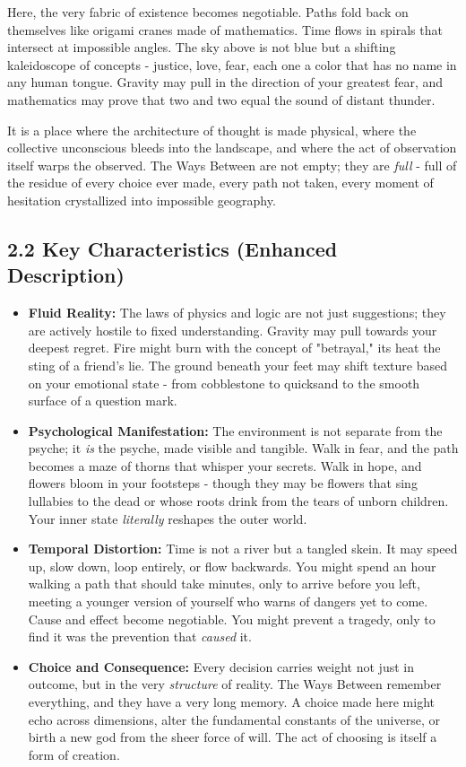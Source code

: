 \documentclass[11pt]{article}
\begin{document}
Here, the very fabric of existence becomes negotiable. Paths fold back on themselves like origami cranes made of mathematics. Time flows in spirals that intersect at impossible angles. The sky above is not blue but a shifting kaleidoscope of concepts - justice, love, fear, each one a color that has no name in any human tongue. Gravity may pull in the direction of your greatest fear, and mathematics may prove that two and two equal the sound of distant thunder.

It is a place where the architecture of thought is made physical, where the collective unconscious bleeds into the landscape, and where the act of observation itself warps the observed. The Ways Between are not empty; they are \textit{full} - full of the residue of every choice ever made, every path not taken, every moment of hesitation crystallized into impossible geography.

\subsection*{2.2 Key Characteristics (Enhanced Description)}

\begin{itemize}
\item \textbf{Fluid Reality:} The laws of physics and logic are not just suggestions; they are actively hostile to fixed understanding. Gravity may pull towards your deepest regret. Fire might burn with the concept of "betrayal," its heat the sting of a friend's lie. The ground beneath your feet may shift texture based on your emotional state - from cobblestone to quicksand to the smooth surface of a question mark.
\item \textbf{Psychological Manifestation:} The environment is not separate from the psyche; it \textit{is} the psyche, made visible and tangible. Walk in fear, and the path becomes a maze of thorns that whisper your secrets. Walk in hope, and flowers bloom in your footsteps - though they may be flowers that sing lullabies to the dead or whose roots drink from the tears of unborn children. Your inner state \textit{literally} reshapes the outer world.
\item \textbf{Temporal Distortion:} Time is not a river but a tangled skein. It may speed up, slow down, loop entirely, or flow backwards. You might spend an hour walking a path that should take minutes, only to arrive before you left, meeting a younger version of yourself who warns of dangers yet to come. Cause and effect become negotiable. You might prevent a tragedy, only to find it was the prevention that \textit{caused} it.
\item \textbf{Choice and Consequence:} Every decision carries weight not just in outcome, but in the very \textit{structure} of reality. The Ways Between remember everything, and they have a very long memory. A choice made here might echo across dimensions, alter the fundamental constants of the universe, or birth a new god from the sheer force of will. The act of choosing is itself a form of creation.
\end{itemize}
\end{document}
